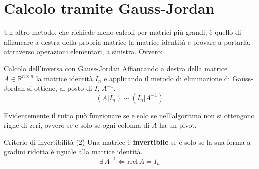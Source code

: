 \section{Calcolo tramite Gauss-Jordan}
Un altro metodo, che richiede meno calcoli per matrici più grandi, è quello di affiancare a destra della propria matrice la matrice identità e provare a portarla, attraverso operazioni elementari, a sinistra. Ovvero:
\begin{teo}{Calcolo dell'inversa con Gauss-Jordan}
    Affiancando a destra della matrice $A \in \mathbb{R}^{n \times n}$ la matrice identità $I_n$ e applicando il metodo di eliminazione di Gauss-Jordan si ottiene, al posto di $I$, $A^{-1}$.
    \[
        (A|I_n) \sim (I_n|A^{-1})
    \]
\end{teo}
Evidentemente il tutto può funzionare se e solo se nell'algoritmo non si ottengono righe di zeri, ovvero se e solo se ogni colonna di $A$ ha un pivot.
\begin{teo}{Criterio di invertibilità (2)}
    Una matrice è \textbf{invertibile} se e solo se la sua forma a gradini ridotta è uguale alla matrice identità.
    \[
        \exists\,A^{-1} \iff \text{rref}\,A = I_n
    \]
\end{teo}
